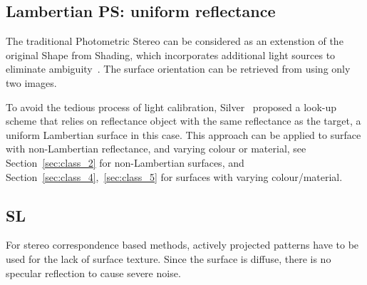 \subsection{Lambertian PS: uniform reflectance}
The traditional Photometric Stereo can be considered as an extenstion of the original Shape from Shading, which incorporates additional light sources to eliminate ambiguity~\cite{woodham1980photometric}. The surface orientation can be retrieved from using only two images.

To avoid the tedious process of light calibration, Silver~\cite{silver1980determining} proposed a look-up scheme that relies on reflectance object with the same reflectance as the target, a uniform Lambertian surface in this case. This approach can be applied to surface with non-Lambertian reflectance, and varying colour or material, see Section~\ref{sec:class_2} for non-Lambertian surfaces, and Section~\ref{sec:class_4},~\ref{sec:class_5} for surfaces with varying colour/material.

\subsection{SL}
For stereo correspondence based methods, actively projected patterns have to be used for the lack of surface texture. Since the surface is diffuse, there is no specular reflection to cause severe noise.

